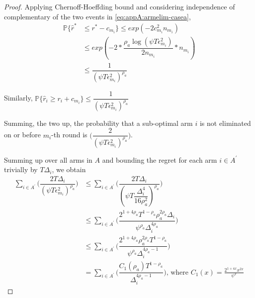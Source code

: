 \begin{proof}
% 
 
 
% 
Applying Chernoff-Hoeffding bound and considering independence of complementary of the two events in \ref{eq:appA:armelim-casea},
  \begin{align*}
\mathbb{P}\lbrace\hat{r}^{*}&\leq r^{*} - c_{m_{i}}\rbrace\leq exp(-2c_{m_{i}}^{2}n_{m_{i}})\\
&\leq exp(-2 * \dfrac{\rho_{a}\log (\psi T\epsilon_{m_{i}}^{2})}{2 n_{m_{i}}} *n_{m_{i}})\\
&\leq \dfrac{1}{(\psi T\epsilon_{m_{i}}^{2})^{\rho_{a}}}   
  \end{align*}
 
 
Similarly, $\mathbb{P}\lbrace\hat{r}_{i}\geq r_{i} + c_{m_{i}}\rbrace\leq \dfrac{1}{(\psi  T\epsilon_{m_{i}}^{2})^{\rho_{a}}}$
 
Summing, the two up, the probability that a sub-optimal arm ${i}$ is not eliminated on or before $m_{i}$-th round is  $\bigg(\dfrac{2}{(\psi T\epsilon_{m_{i}}^{2})^{\rho_{a}}}\bigg)$. 
 
Summing up over all arms in $A$ and bounding the regret for each arm $i\in A^{'}$ trivially by $T\Delta_{i}$, we obtain
   \begin{align*}
\sum_{i\in A^{'}}\bigg(\dfrac{2T\Delta_{i}}{(\psi T\epsilon_{m_{i}}^{2})^{\rho_{a}}}\bigg)
&\leq\sum_{i\in A^{'}}\bigg(\dfrac{2T\Delta_{i}}{(\psi T\dfrac{\Delta_{i}^{4}}{16\rho_{a}^{2}})^{\rho_{a}}}\bigg)\\
&\leq \sum_{i\in A^{'}}\bigg(\dfrac{2^{1+4\rho_{a}}T^{1-\rho_{a}}\rho_{a}^{2\rho_{a}}\Delta_{i}}{\psi^{\rho_{a}}\Delta_{i}^{4\rho_{a}}}\bigg)\\
&\leq \sum_{i\in A^{'}}\bigg(\dfrac{2^{1+4\rho_{a}}\rho_{a}^{2\rho_{a}}T^{1-\rho_{a}}}{\psi^{\rho_{a}}\Delta_{i}^{4\rho_{a}-1}}\bigg)\\   
& =\sum_{i\in A^{'}}\bigg(\dfrac{C_{1}(\rho_{a})T^{1-\rho_{a}}}{\Delta_{i}^{4\rho_{a}-1}}\bigg) \text{, where } C_1(x) = \frac{2^{1+4x}x^{2x}}{\psi^{x}}
   \end{align*}


\end{proof}
